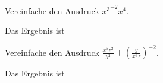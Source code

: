 \documentclass{ximera}
\begin{document}
\begin{question}
Vereinfache den Ausdruck ${x^3}^{-2} x^4.$
\begin{solution}
Das Ergebnis ist 
\end{solution}
\end{question}

\begin{question}
Vereinfache den Ausdruck $\frac{x^6z^2}{y^2} + \left(\frac{y}{x^3z}\right)^{-2}$.
\begin{solution}
Das Ergebnis ist 
\end{solution}
    
\end{question}
\end{document}
